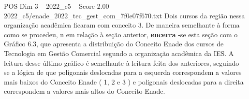 \begin{textsample}{POS Dim 3 – 2022\_c5 – Score 2.00 – 2022\_c5/enade\_2022\_tec\_gest\_com\_7f0e07f670.txt}
Dois cursos da região nessa organização acadêmica ficaram com conceito 3.
De maneira semelhante à forma como se procedeu, n em relação à seção anterior, \textbf{encerra} -se esta seção com o Gráfico 6.3, que apresenta a distribuição do Conceito Enade dos cursos de Tecnologia em Gestão Comercial segundo a organização acadêmica da IES.
A leitura desse último gráfico é semelhante à leitura feita dos anteriores, seguindo -se a lógica de que poligonais deslocadas para a esquerda correspondem a valores mais baixos do Conceito Enade ( 1, 2 e 3 ) e poligonais deslocadas para a direita correspondem a valores mais altos do Conceito Enade.

\end{textsample}
